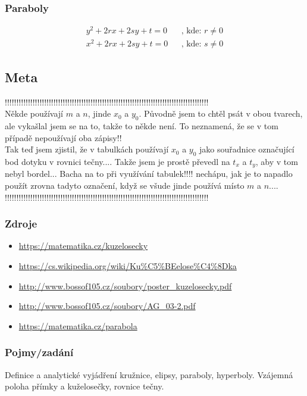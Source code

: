\documentclass[12pt]{article}
\begin{document}
\subsubsection{Paraboly}
\begin{align}
y^2 +2rx+2sy +t =0 && \text{, kde: } r \neq 0 \\
x^2 +2rx+2sy +t =0 && \text{, kde: } s \neq 0
\end{align}
\subsection{Meta}
\label{sec:kuz_meta}
!!!!!!!!!!!!!!!!!!!!!!!!!!!!!!!!!!!!!!!!!!!!!!!!!!!!!!!!!!!!!!!!!!!!!!!!!!!!!!!!!!!!!!!!\\
Někde používají $m$ a $n$, jinde $x_0$ a $y_0$. Původně jsem to chtěl psát v obou tvarech, ale vykašlal jsem se na to, takže to někde není. To neznamená, že se v tom případě nepoužívají oba zápisy!!\\
Tak teď jsem zjistil, že v tabulkách používají $x_0$ a $y_0$ jako souřadnice označující bod dotyku v rovnici tečny.... Takže jsem je prostě převedl na $t_x$ a $t_y$, aby v tom nebyl bordel... Bacha na to při využívání tabulek!!!! nechápu, jak je to napadlo použít zrovna tadyto označení, když se všude jinde používá místo $m$ a $n$.... \\
!!!!!!!!!!!!!!!!!!!!!!!!!!!!!!!!!!!!!!!!!!!!!!!!!!!!!!!!!!!!!!!!!!!!!!!!!!!!!!!!!!!!!!!!\\
\subsubsection{Zdroje}
\begin{itemize}
\item \url{https://matematika.cz/kuzelosecky}
\item \url{https://cs.wikipedia.org/wiki/Ku\%C5\%BEelose\%C4\%8Dka}
\item \url{http://www.bossof105.cz/soubory/poster_kuzelosecky.pdf}
\item \url{http://www.bossof105.cz/soubory/AG_03-2.pdf}
\item \url{https://matematika.cz/parabola}
\end{itemize}
\subsubsection{Pojmy/zadání}
Definice a analytické vyjádření kružnice, elipsy, paraboly, hyperboly. Vzájemná poloha přímky a kuželosečky, rovnice tečny.
\end{document}

